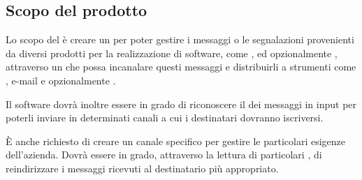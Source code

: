 \subsection{Scopo del prodotto}



Lo scopo del  è creare un  per poter gestire i messaggi o le segnalazioni provenienti da diversi prodotti per la realizzazione di software,
come ,  ed opzionalmente , attraverso un  che possa incanalare questi messaggi e distribuirli a strumenti come
, e-mail e opzionalmente .\par
Il software dovrà inoltre essere in grado di riconoscere il  dei messaggi in input per poterli inviare in determinati canali a cui i
destinatari dovranno iscriversi.\par
\`E anche richiesto di creare un canale specifico per gestire le particolari esigenze dell'azienda. Dovrà essere in grado, attraverso la lettura di
particolari	, di reindirizzare i messaggi ricevuti al destinatario più appropriato.



